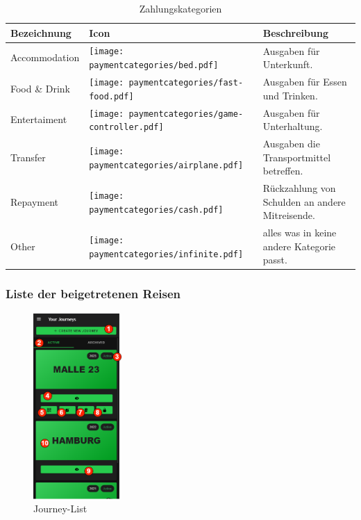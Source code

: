\begin{table}[H]
	\caption{Zahlungskategorien}
	\begin{tabularx}{0.95\textwidth}{ |X|X|X| }
		\hline
		\rowcolor{gray} \textbf{Bezeichnung} & \textbf{Icon}                                                                 & Beschreibung                                    \\
		\hline
		Accommodation                        & \texttt{[image: paymentcategories/bed.pdf]}             &
		Ausgaben für Unterkunft.                                                                                                                                               \\
		\hline
		Food \& Drink                          & \texttt{[image: paymentcategories/fast-food.pdf]}       & Ausgaben für Essen und Trinken.                 \\
		\hline
		Entertaiment                         & \texttt{[image: paymentcategories/game-controller.pdf]} & Ausgaben für Unterhaltung.                      \\
		\hline
		Transfer                             & \texttt{[image: paymentcategories/airplane.pdf]}        & Ausgaben die Transportmittel betreffen.         \\
		\hline
		Repayment                            & \texttt{[image: paymentcategories/cash.pdf]}            & Rückzahlung von Schulden an andere Mitreisende. \\
		\hline
		Other                                & \texttt{[image: paymentcategories/infinite.pdf]}        & alles was in keine andere Kategorie passt.      \\
		\hline
	\end{tabularx}
	\label{Tab:paymentcategories}
\end{table}

\subsubsection{Liste der beigetretenen Reisen}\label{Journey-List}
\begin{figure}[H]
	\centering
	\includegraphics[width=0.3\textwidth]{img/pages_numbers/journey-list.drawio}
	\caption[Journey-List]{Journey-List}
	\label{fig:Journey-List}
\end{figure}

